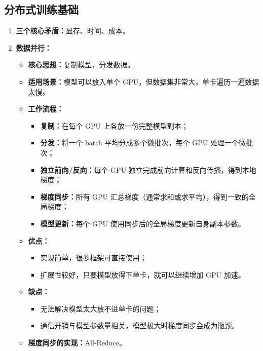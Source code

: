 \documentclass[../main.tex]{subfiles}
\begin{document}
\subsection{分布式训练基础}
\begin{enumerate}
    \item \textbf{三个核心矛盾：}显存、时间、成本。

    \item \textbf{数据并行：}
    \begin{itemize}
        \item \textbf{核心思想：}复制模型，分发数据。
        \item \textbf{适用场景：}模型可以放入单个 GPU，但数据集非常大，单卡遍历一遍数据太慢。
        \item \textbf{工作流程：}
        \begin{itemize}
            \item \textbf{复制：}在每个 GPU 上各放一份完整模型副本；
            \item \textbf{分发：}将一个 batch 平均分成多个微批次，每个 GPU 处理一个微批次；
            \item \textbf{独立前向/反向：}每个 GPU 独立完成前向计算和反向传播，得到本地梯度；
            \item \textbf{梯度同步：}所有 GPU 汇总梯度（通常求和或求平均），得到一致的全局梯度；
            \item \textbf{模型更新：}每个 GPU 使用同步后的全局梯度更新自身副本参数。
        \end{itemize}
        \item \textbf{优点：}
        \begin{itemize}
            \item 实现简单，很多框架可直接使用；
            \item 扩展性较好，只要模型放得下单卡，就可以继续增加 GPU 加速。
        \end{itemize}
        \item \textbf{缺点：}
        \begin{itemize}
            \item 无法解决模型太大放不进单卡的问题；
            \item 通信开销与模型参数量相关，模型极大时梯度同步会成为瓶颈。
        \end{itemize}
        \item \textbf{梯度同步的实现：}All-Reduce。
    \end{itemize}


\end{enumerate}
\end{document}
